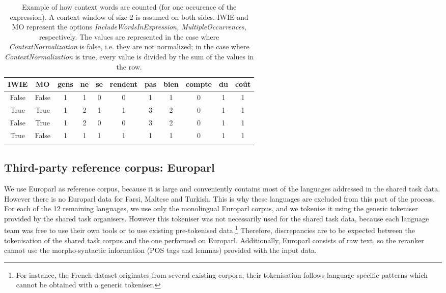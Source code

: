 \documentclass[output=paper
,modfonts
,nonflat]{langsci/langscibook}
\begin{document}
 \begin{table}
{\small
\begin{tabular}{ccccccccccc}
\lsptoprule
 IWIE & MO & gens & ne & {\bf se} & {\bf rendent} & pas & bien & {\bf compte} & du & coût \\
\midrule
  
  False   &      False                       & 1 & 1 & 0 & 0& 1& 1& 0& 1& 1 \\

  True&           True                       &1&2&1&1&3&2&0&1&1\\

  False    &      True                       &1&2&0&0&3&2&0&1&1 \\


  True &          False                       &1&1&1&1&1&1&0&1&1\\
\lspbottomrule

\end{tabular}
}
\caption{\label{tab:contextExample}{Example of how context words are counted (for one occurence of the expression).} A context window of size 2 is assumed on both sides. IWIE and MO represent the options {\em IncludeWordsInExpression, MultipleOccurrences}, respectively. The values are represented in the case where {\em ContextNormalization} is false, i.e. they are not normalized; in the case where {\em ContextNormalization} is true, every value is divided by the sum of the values in the row.}
\end{table}



\subsection{Third-party reference corpus: Europarl}
\label{subsec:europarl}

We use Europarl \citep{europarl} as reference corpus, because it is
large and conveniently contains most of the languages addressed in the
shared task data. However there is no Europarl data for Farsi, Maltese
and Turkish. This is why these languages are excluded from this part
of the process. For each of the 12 remaining languages, we use only
the monolingual Europarl corpus, and we tokenise it using the generic
tokeniser provided by the shared task organisers. However this
tokeniser was not necessarily used for the shared task data, because
each language team was free to use their own tools or to use existing
pre-tokenised data.\footnote{For instance, the French dataset
  originates from several existing corpora; their tokenisation follows
  language-specific patterns which cannot be obtained with a generic
  tokeniser.}  Therefore, discrepancies are to be expected between the
tokenisation of the shared task corpus and the one performed on
Europarl. Additionally, Europarl consists of raw text, so the reranker
cannot use the morpho-syntactic information (POS tags and lemmas)
provided with the input data.
\end{document}
